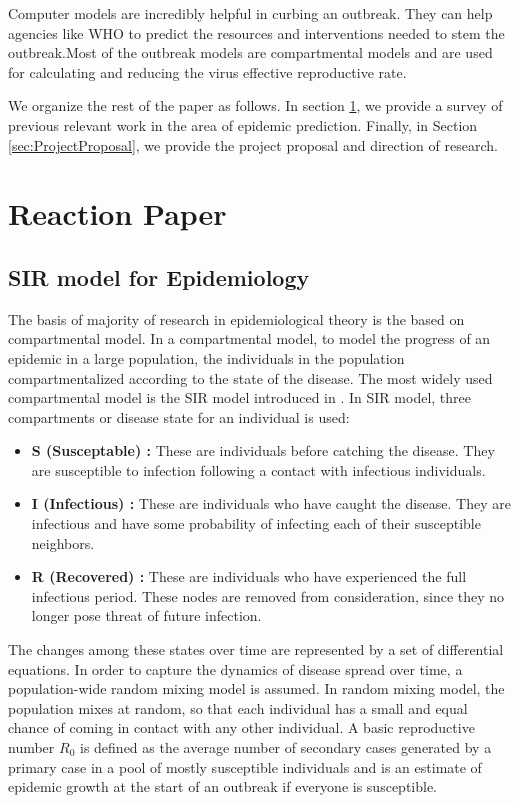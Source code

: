 \documentclass[12pt, journal,onecolumn]{IEEEtran}
\begin{document}
Computer models are incredibly helpful in curbing an outbreak. They can help agencies like WHO to predict the resources and interventions needed
to stem the outbreak.Most of the outbreak models  are compartmental models and are used  for calculating and reducing the virus effective reproductive rate.



We organize the rest of the paper as follows. In section \ref{sec:ReactionPaper}, we provide a survey of previous relevant work in the area of epidemic prediction.
Finally, in Section \ref{sec:ProjectProposal}, we provide the project proposal and direction of research.

\section{Reaction Paper}
\label{sec:ReactionPaper}
\subsection{SIR model for Epidemiology}
\label{SubSec:SIR}
The basis of majority of research in epidemiological theory is the based on compartmental model. In a compartmental model, to model the progress of an epidemic in a large population, the individuals in the population compartmentalized according to the state of the disease. The most widely used compartmental model is the SIR model introduced in \cite{very_old_paper}. In SIR model, three compartments or disease state for an individual is used:

\begin{itemize}
\item \textbf{S (Susceptable) : } These are individuals before catching the disease. They are susceptible to infection following a contact with infectious individuals.
\item \textbf{I (Infectious) : }These are individuals who have caught the disease. They are infectious and have some probability of infecting each of their susceptible neighbors.
\item \textbf{R (Recovered) : }These are individuals who have experienced the full infectious period. These nodes are removed from consideration, since they no longer pose threat of future infection.
\end{itemize}

The changes among these states over time are represented by a set of differential equations. In order to capture the dynamics of disease spread over time, a population-wide random mixing model is assumed. In random mixing model, the population mixes at random, so that each individual has a small and equal chance of coming in contact with any other individual. A basic reproductive number $R_0$ is defined as the average number of secondary cases generated by a primary case in a pool of mostly susceptible individuals and is an estimate of epidemic growth at the start of an outbreak if everyone is susceptible.
\end{document}
